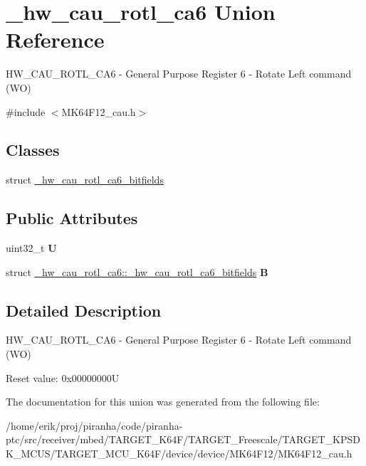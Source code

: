\hypertarget{union__hw__cau__rotl__ca6}{}\section{\+\_\+hw\+\_\+cau\+\_\+rotl\+\_\+ca6 Union Reference}
\label{union__hw__cau__rotl__ca6}


H\+W\+\_\+\+C\+A\+U\+\_\+\+R\+O\+T\+L\+\_\+\+C\+A6 -\/ General Purpose Register 6 -\/ Rotate Left command (WO)  




{\ttfamily \#include $<$M\+K64\+F12\+\_\+cau.\+h$>$}

\subsection*{Classes}
\begin{DoxyCompactItemize}
\item 
struct \hyperlink{struct__hw__cau__rotl__ca6_1_1__hw__cau__rotl__ca6__bitfields}{\+\_\+hw\+\_\+cau\+\_\+rotl\+\_\+ca6\+\_\+bitfields}
\end{DoxyCompactItemize}
\subsection*{Public Attributes}
\begin{DoxyCompactItemize}
\item 
uint32\+\_\+t {\bfseries U}\hypertarget{union__hw__cau__rotl__ca6_a4f15446f26f030048063aa409d74eb2e}{}\label{union__hw__cau__rotl__ca6_a4f15446f26f030048063aa409d74eb2e}

\item 
struct \hyperlink{struct__hw__cau__rotl__ca6_1_1__hw__cau__rotl__ca6__bitfields}{\+\_\+hw\+\_\+cau\+\_\+rotl\+\_\+ca6\+::\+\_\+hw\+\_\+cau\+\_\+rotl\+\_\+ca6\+\_\+bitfields} {\bfseries B}\hypertarget{union__hw__cau__rotl__ca6_af80f42f2a35e2c541a1c2d0090998148}{}\label{union__hw__cau__rotl__ca6_af80f42f2a35e2c541a1c2d0090998148}

\end{DoxyCompactItemize}


\subsection{Detailed Description}
H\+W\+\_\+\+C\+A\+U\+\_\+\+R\+O\+T\+L\+\_\+\+C\+A6 -\/ General Purpose Register 6 -\/ Rotate Left command (WO) 

Reset value\+: 0x00000000U 

The documentation for this union was generated from the following file\+:\begin{DoxyCompactItemize}
\item 
/home/erik/proj/piranha/code/piranha-\/ptc/src/receiver/mbed/\+T\+A\+R\+G\+E\+T\+\_\+\+K64\+F/\+T\+A\+R\+G\+E\+T\+\_\+\+Freescale/\+T\+A\+R\+G\+E\+T\+\_\+\+K\+P\+S\+D\+K\+\_\+\+M\+C\+U\+S/\+T\+A\+R\+G\+E\+T\+\_\+\+M\+C\+U\+\_\+\+K64\+F/device/device/\+M\+K64\+F12/M\+K64\+F12\+\_\+cau.\+h\end{DoxyCompactItemize}

